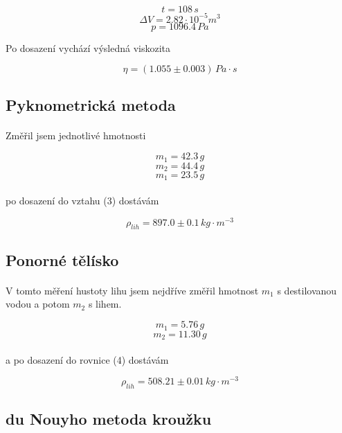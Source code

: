 \documentclass[a4paper,11pt]{article}
\begin{document}
        $$t = 108 \, s$$
        $$\Delta V = 2.82 \cdot 10^{-5} m^{3} $$
        $$p = 1096.4 \, Pa $$

        Po dosazení vychází výsledná viskozita

        $$ \eta = \left(1.055 \pm 0.003\right) \, Pa \cdot s$$

    \subsection{Pyknometrická metoda}

        \paragraph{} Změřil jsem jednotlivé hmotnosti

        $$ m_{1} = 42.3 \, g $$
        $$ m_{2} = 44.4 \, g $$
        $$ m_{1} = 23.5 \, g $$

        \paragraph{} po dosazení do vztahu (3) dostávám

        $$ \rho_{lih} = 897.0 \pm 0.1 \, kg \cdot m^{-3} $$

    \subsection{Ponorné tělísko}

        \paragraph{} V tomto měření hustoty lihu jsem nejdříve změřil hmotnost $m_{1}$ s
        destilovanou vodou a potom $m_{2}$ s lihem.

        $$ m_{1} = 5.76 \, g $$
        $$ m_{2} = 11.30 \, g $$

        \paragraph{} a po dosazení do rovnice (4) dostávám

        $$ \rho_{lih} = 508.21 \pm 0.01 \, kg \cdot m^{-3} $$
    
    \subsection{du Nouyho metoda kroužku}
\end{document}
